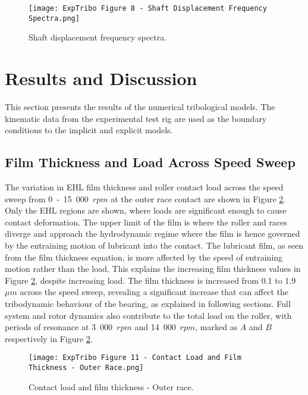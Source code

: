 \begin{figure}
	\centering
	\texttt{[image: ExpTribo Figure 8 - Shaft Displacement Frequency Spectra.png]}
	\caption{Shaft displacement frequency spectra.}
	\label{Shaft displacement frequency spectra}
\end{figure}

\section{Results and Discussion}
This section presents the results of the numerical tribological models. The kinematic data from the experimental test rig are used as the boundary conditions to the implicit and explicit models.

\subsection{Film Thickness and Load Across Speed Sweep} 
The variation in EHL film thickness and roller contact load across the speed sweep from 0~-~15~000~$rpm$ at the outer race contact are shown in Figure \ref{Contact load and film thickness - Outer race}. Only the EHL regions are shown, where loads are significant enough to cause contact deformation. The upper limit of the film is where the roller and races diverge and approach the hydrodynamic regime where the film is hence governed by the entraining motion of lubricant into the contact. The lubricant film, as seen from the film thickness equation, is more affected by the speed of entraining motion rather than the load. This explains the increasing film thickness values in Figure \ref{Contact load and film thickness - Outer race}, despite increasing load. The film thickness is increased from 0.1 to 1.9~$\mu m$ across the speed sweep, revealing a significant increase that can affect the tribodynamic behaviour of the bearing, as explained in following sections. Full system and rotor dynamics also contribute to the total load on the roller, with periods of resonance at 3~000~$rpm$ and 14~000~$rpm$, marked as $A$ and $B$ respectively in Figure \ref{Contact load and film thickness - Outer race}.

\begin{figure}
	\centering
	\texttt{[image: ExpTribo Figure 11 - Contact Load and Film Thickness - Outer Race.png]}
	\caption{Contact load and film thickness - Outer race.}
	\label{Contact load and film thickness - Outer race}
\end{figure}

